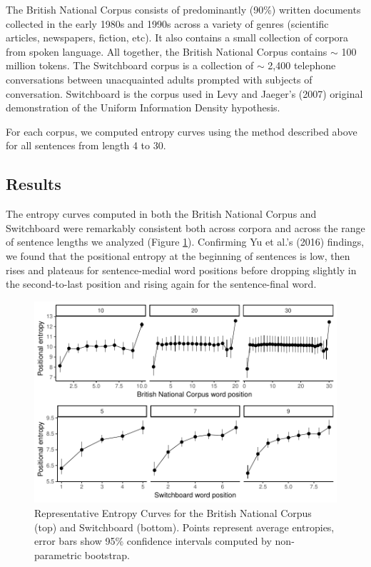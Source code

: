 \documentclass[10pt, letterpaper]{article}
\newenvironment{CodeChunk}{}{}
\begin{document}
The British National Corpus consists of predominantly (90\%) written
documents collected in the early 1980s and 1990s across a variety of
genres (scientific articles, newspapers, fiction, etc). It also contains
a small collection of corpora from spoken language. All together, the
British National Corpus contains \(\sim\) 100 million tokens. The
Switchboard corpus is a collection of \(\sim\) 2,400 telephone
conversations between unacquainted adults prompted with subjects of
conversation. Switchboard is the corpus used in Levy and Jaeger's (2007)
original demonstration of the Uniform Information Density hypothesis.

For each corpus, we computed entropy curves using the method described
above for all sentences from length 4 to 30.

\subsection{Results}\label{results}

The entropy curves computed in both the British National Corpus and
Switchboard were remarkably consistent both across corpora and across
the range of sentence lengths we analyzed (Figure
\ref{fig:read_and_plot_exp1}). Confirming Yu et al.'s (2016) findings,
we found that the positional entropy at the beginning of sentences is
low, then rises and plateaus for sentence-medial word positions before
dropping slightly in the second-to-last position and rising again for
the sentence-final word.

\begin{CodeChunk}
\begin{figure}[tb]

{\centering \includegraphics{figs/read_and_plot_exp1-1} 

}

\caption[Representative Entropy Curves for the British National Corpus (top) and Switchboard (bottom)]{Representative Entropy Curves for the British National Corpus (top) and Switchboard (bottom). Points represent average entropies, error bars show 95\% confidence intervals computed by non-parametric bootstrap.}\label{fig:read_and_plot_exp1}
\end{figure}
\end{CodeChunk}
\end{document}
